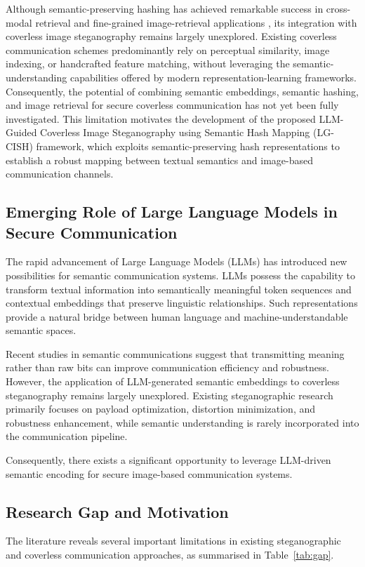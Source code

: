 \documentclass[11pt]{article}
\theoremstyle{definition}
\begin{document}
Although semantic-preserving hashing has achieved remarkable success in cross-modal
retrieval and fine-grained image-retrieval applications \cite{huJSPSH,liSPHCG}, its integration with
coverless image steganography remains largely unexplored. Existing coverless
communication schemes predominantly rely on perceptual similarity, image indexing,
or handcrafted feature matching, without leveraging the semantic-understanding
capabilities offered by modern representation-learning frameworks. Consequently, the
potential of combining semantic embeddings, semantic hashing, and image retrieval
for secure coverless communication has not yet been fully investigated. This
limitation motivates the development of the proposed LLM-Guided Coverless Image
Steganography using Semantic Hash Mapping (LG-CISH) framework, which exploits
semantic-preserving hash representations to establish a robust mapping between
textual semantics and image-based communication channels.

\subsection{Emerging Role of Large Language Models in Secure Communication}
The rapid advancement of Large Language Models (LLMs) has introduced new
possibilities for semantic communication systems. LLMs possess the capability to
transform textual information into semantically meaningful token sequences and
contextual embeddings that preserve linguistic relationships. Such representations
provide a natural bridge between human language and machine-understandable semantic
spaces.

Recent studies in semantic communications suggest that transmitting meaning rather
than raw bits can improve communication efficiency and robustness. However, the
application of LLM-generated semantic embeddings to coverless steganography remains
largely unexplored. Existing steganographic research primarily focuses on payload
optimization, distortion minimization, and robustness enhancement, while semantic
understanding is rarely incorporated into the communication pipeline.

Consequently, there exists a significant opportunity to leverage LLM-driven semantic
encoding for secure image-based communication systems.

\subsection{Research Gap and Motivation}\label{sec:motivation}
The literature reveals several important limitations in existing steganographic and
coverless communication approaches, as summarised in Table~\ref{tab:gap}.
\end{document}
